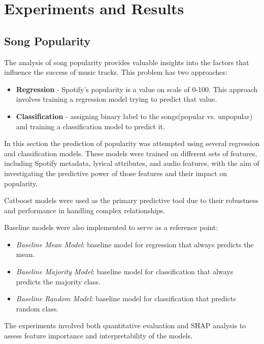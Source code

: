 \chapter{Experiments and Results}
\label{cha:experimentsandresults}

\section{Song Popularity}
\label{sec:songpopularity}

The analysis of song popularity provides valuable insights into the factors
that influence the success of music tracks. This problem has two approaches:
\begin{itemize}
  \item \textbf{Regression} - Spotify's popularity is a value on scale of
    0-100. This approach involves training a regression model trying to predict
    that value.
  \item \textbf{Classification} - assigning binary label to the songs(popular
    vs. unpopular) and training a classification model to predict it.
\end{itemize}

In this section the prediction of popularity was attempted using several
regression and classification models. These models were trained on different
sets of features, including Spotify metadata, lyrical attributes, and audio
features, with the aim of investigating the predictive power of those features
and their impact on popularity.

Catboost models were used as the primary predictive tool due to their
robustness and performance in handling complex relationships. 

Baseline models were also implemented to serve as a reference point:
\begin{itemize}
  \item \textit{Baseline Mean Model}: baseline model for regression that always
    predicts the mean.
  \item \textit{Baseline Majority Model}: baseline model for classification
    that always predicts the majority class.
  \item \textit{Baseline Random Model}: baseline model for classification that
    predicts random class.
\end{itemize}

The experiments involved both quantitative evaluation and SHAP analysis to
assess feature importance and interpretability of the models.

